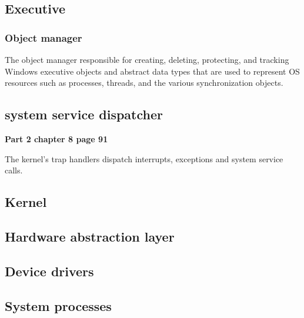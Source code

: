 \subsection{Executive}

\subsubsection{Object manager}
The object manager responsible for creating, deleting, protecting, and tracking Windows executive objects and abstract data types that are used to represent OS resources such as processes, threads, and the various synchronization objects.



\subsection{system service dispatcher}

{\bf Part 2 chapter 8 page 91}

The kernel's trap handlers dispatch interrupts, exceptions and system service calls.

\subsection{Kernel}

\subsection{Hardware abstraction layer}
\subsection{Device drivers}
\subsection{System processes}